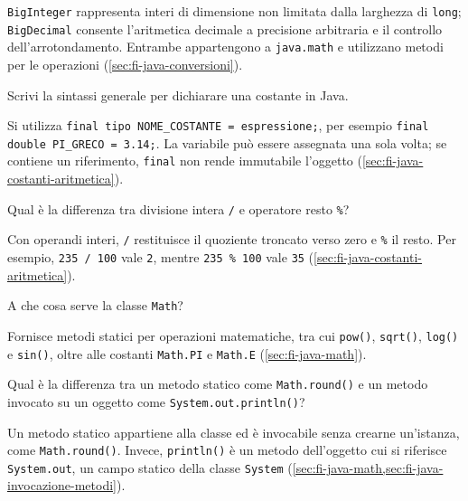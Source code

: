 \texttt{BigInteger} rappresenta interi di dimensione non limitata
dalla larghezza di \texttt{long}; \texttt{BigDecimal} consente
l'aritmetica decimale a precisione arbitraria e il controllo
dell'arrotondamento. Entrambe appartengono a \texttt{java.math}
e utilizzano metodi per le operazioni
(\cref{sec:fi-java-conversioni}).

\begin{exercise}
\label{ex:fi-esercizi-java-collaudo-costante}
Scrivi la sintassi generale per dichiarare una costante in Java.
\end{exercise}

Si utilizza \texttt{final tipo NOME\_COSTANTE = espressione;},
per esempio \texttt{final double PI\_GRECO = 3.14;}.
La variabile può essere assegnata una sola volta; se contiene un
riferimento, \texttt{final} non rende immutabile l'oggetto
(\cref{sec:fi-java-costanti-aritmetica}).

\begin{exercise}
\label{ex:fi-esercizi-java-collaudo-divisione-resto}
Qual è la differenza tra divisione intera \texttt{/} e operatore
resto \texttt{\%}?
\end{exercise}

Con operandi interi, \texttt{/} restituisce il quoziente troncato
verso zero e \texttt{\%} il resto. Per esempio,
\texttt{235 / 100} vale \texttt{2}, mentre
\texttt{235 \% 100} vale \texttt{35}
(\cref{sec:fi-java-costanti-aritmetica}).

\begin{exercise}
\label{ex:fi-esercizi-java-collaudo-math-classe}
A che cosa serve la classe \texttt{Math}?
\end{exercise}

Fornisce metodi statici per operazioni matematiche, tra cui
\texttt{pow()}, \texttt{sqrt()}, \texttt{log()} e \texttt{sin()},
oltre alle costanti \texttt{Math.PI} e \texttt{Math.E}
(\cref{sec:fi-java-math}).

\begin{exercise}
\label{ex:fi-esercizi-java-collaudo-metodi-statici-oggetto}
Qual è la differenza tra un metodo statico come
\texttt{Math.round()} e un metodo invocato su un oggetto come
\texttt{System.out.println()}?
\end{exercise}

Un metodo statico appartiene alla classe ed è invocabile senza
crearne un'istanza, come \texttt{Math.round()}. Invece,
\texttt{println()} è un metodo dell'oggetto cui si riferisce
\texttt{System.out}, un campo statico della classe \texttt{System}
(\cref{sec:fi-java-math,sec:fi-java-invocazione-metodi}).

